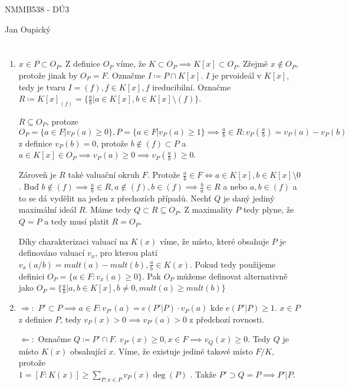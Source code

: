 \documentclass[12pt, a4paper]{article}
\begin{document}
\begin{center}
\large NMMB538 - DÚ3

\normalsize Jan Oupický
\end{center}
\vspace{1\baselineskip}

\section{}
\begin{enumerate}[label=(\alph*)]
    \item $x \in P \subset O_P$. Z definice $O_P$ víme, že $K \subset O_P \implies K[x] \subset O_P$. Zřejmě $x\notin O_P$, protože jinak by $O_P = F$. Označme $I \coloneqq P \cap K[x]$. $I$ je prvoideál v $K[x]$, tedy je tvaru $I = (f), f \in K[x], f$ ireducibilní. Označme $R \coloneqq K[x]_{(f)} = \{ \frac{a}{b} | a \in K[x], b \in K[x] \setminus (f) \}$. 

    $R \subseteq O_P$, protoze $O_P = \{a \in F | v_P(a) \geq 0 \}, P = \{ a \in F | v_P(a) \geq 1 \} \implies \frac{a}{b} \in R: v_P(\frac{a}{b}) = v_P(a)-v_P(b)$ z definice $v_P(b)=0$, protože $b \notin (f) \subset P$ a $a \in K[x] \in O_P \implies v_P(a) \geq 0 \implies v_P(\frac{a}{b}) \geq 0$. 

    Zároveň je $R$ také valuační okruh $F$. Protože $\frac{a}{b} \in F \iff a \in K[x], b \in K[x]\setminus 0$. Buď $b \notin (f) \implies \frac{a}{b} \in R, a \notin (f), b \in (f) \implies \frac{b}{a} \in R$ a nebo $a,b \in (f)$ a to se dá vydělit na jeden z přechozích případů. Nechť $Q$ je daný jediný maximální ideál $R$. Máme tedy $Q \subset R \subseteq O_P$. Z maximality $P$ tedy plyne, že $Q = P$ a tedy musí platit $R = O_P$.

    Díky charakterizaci valuací na $K(x)$ víme, že místo, které obsahuje $P$ je definováno valuací $v_x$, pro kterou platí $v_x(a/b) = mult(a)-mult(b), \frac{a}{b} \in K(x)$. Pokud tedy použijeme definici $O_P = \{a \in F: v_x(a) \ge 0\}$. Pak $O_P$ můžeme definovat alternativně jako $O_P = \{ \frac{a}{b} | a,b \in K[x], b\neq 0, mult(a) \ge mult(b)\}$

    \item $\Rightarrow:$ $P' \subset P \implies a\in F : v_{P'}(a) = e(P'|P)\cdot v_P(a)$ kde $e(P'|P)\geq 1$. $x \in P$ z definice $P$, tedy $v_P(x) > 0 \implies v_{P'}(a) > 0$ z předchozí rovnosti.

    $\Leftarrow:$ Označme $Q \coloneqq P' \cap F$. $v_{P'}(x)\geq 0, x \in F \implies v_Q(x) \geq 0$. Tedy $Q$ je místo $K(x)$ obsahující $x$. Víme, že existuje jediné takové místo $F/K$, protože \\$1=[F:K(x)]\geq \sum_{P:x\in P} v_P(x)\deg(P)$ . Takže $P' \supset Q = P \implies P' | P$.


\end{enumerate}
\end{document}
